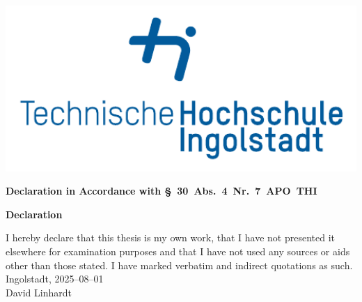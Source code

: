 \documentclass[11pt, a4paper, oneside, listof=totoc]{scrartcl}
\begin{document}
    \begin{titlepage}
        \hspace*{-1.5cm}
        \noindent
        \hfill
        \begin{minipage}{0.3\textwidth}
            \raggedleft\
            \hspace*{1cm}
            \includegraphics[width=1\textwidth]{images/thi_logo.pdf}
        \end{minipage}

        \vspace{1cm}

        \LARGE\textbf{Declaration in Accordance with §~30~Abs.~4~Nr.~7~APO~THI}\\

        \vspace{1cm}

        \hrulefill

        \vspace{2cm}
        
        \begin{center}
            \LARGE\textbf{Declaration}\\
        \end{center}
        \vspace{1cm}
        \normalsize
        I hereby declare that this thesis is my own work, that I have not presented it elsewhere for
        examination purposes and that I have not used any sources or aids other than those stated.
        I have marked verbatim and indirect quotations as such.\\[1cm]
        Ingolstadt, 2025--08--01\\[2cm]
        David Linhardt

    \end{titlepage}

    \restoregeometry

\end{document}
